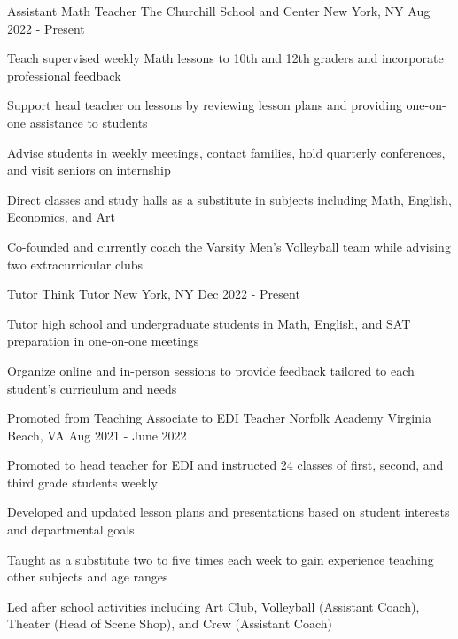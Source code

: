 \begin{cventries}
  \cventry
  {Assistant Math Teacher}
  {The Churchill School and Center}
  {New York, NY}
  {Aug 2022 - Present}
  {
    \begin{cvitems}
      \item {Teach supervised weekly Math lessons to 10th and 12th graders and incorporate professional feedback}
      \item {Support head teacher on lessons by reviewing lesson plans and providing one-on-one assistance to students}
      \item {Advise students in weekly meetings, contact families, hold quarterly conferences, and visit seniors on internship}
      \item {Direct classes and study halls as a substitute in subjects including Math, English, Economics, and Art}
      \item {Co-founded and currently coach the Varsity Men's Volleyball team while advising two extracurricular clubs}
    \end{cvitems}
  }

  \cventry
  {Tutor}
  {Think Tutor}
  {New York, NY}
  {Dec 2022 - Present}
  {
    \begin{cvitems}
      \item {Tutor high school and undergraduate students in Math, English, and SAT preparation in one-on-one meetings}
      \item {Organize online and in-person sessions to provide feedback tailored to each student's curriculum and needs}
    \end{cvitems}
  }

  \cventry
  {Promoted from Teaching Associate to EDI Teacher}
  {Norfolk Academy}
  {Virginia Beach, VA}
  {Aug 2021 - June 2022}
  {
    \begin{cvitems}
      \item {Promoted to head teacher for EDI and instructed 24 classes of first, second, and third grade students weekly}
      \item {Developed and updated lesson plans and presentations based on student interests and departmental goals}
      \item {Taught as a substitute two to five times each week to gain experience teaching other subjects and age ranges}
      \item {Led after school activities including Art Club, Volleyball (Assistant Coach), Theater (Head of Scene Shop), and Crew (Assistant Coach)}
    \end{cvitems}
  }


\end{cventries}
